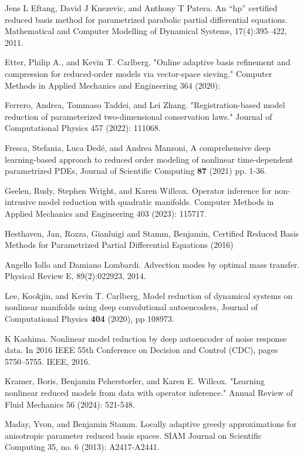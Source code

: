 \begin{thebibliography}{99.}
Jens L Eftang, David J Knezevic, and Anthony T Patera. An “hp” certified reduced
basis method for parametrized parabolic partial differential equations. Mathematical
and Computer Modelling of Dynamical Systems, 17(4):395–422, 2011.

Etter, Philip A., and Kevin T. Carlberg. "Online adaptive basis refinement and compression for reduced-order models via vector-space sieving." Computer Methods in Applied Mechanics and Engineering 364 (2020): 


Ferrero, Andrea, Tommaso Taddei, and Lei Zhang. "Registration-based model reduction of parameterized two-dimensional conservation laws." Journal of Computational Physics 457 (2022): 111068.


Fresca, Stefania, Luca Dedé, and Andrea Manzoni, A comprehensive deep learning-based approach to reduced order modeling of nonlinear time-dependent parametrized PDEs, Journal of Scientific Computing {\bf 87} (2021) pp. 1-36.

Geelen, Rudy, Stephen Wright, and Karen Willcox. Operator inference for non-intrusive model reduction with quadratic manifolds. Computer Methods in Applied Mechanics and Engineering 403 (2023): 115717.



Hesthaven, Jan, Rozza, Gianluigi and Stamm, Benjamin, Certified Reduced Basis Methods for Parametrized Partial Differential Equations (2016)


Angello Iollo and Damiano Lombardi. Advection modes by optimal mass transfer. Physical Review E, 89(2):022923, 2014.



Lee, Kookjin, and Kevin T. Carlberg, Model reduction of dynamical systems on nonlinear manifolds using deep convolutional autoencoders,  Journal of Computational Physics {\bf 404} (2020), pp 108973.

K Kashima. Nonlinear model reduction by deep autoencoder of noise response data. In 2016 IEEE 55th Conference on Decision and Control (CDC), pages 5750–5755. IEEE, 2016.

Kramer, Boris, Benjamin Peherstorfer, and Karen E. Willcox. "Learning nonlinear reduced models from data with operator inference." Annual Review of Fluid Mechanics 56 (2024): 521-548.


Maday, Yvon, and Benjamin Stamm. Locally adaptive greedy approximations for anisotropic parameter reduced basis spaces. SIAM Journal on Scientific Computing 35, no. 6 (2013): A2417-A2441.



\end{thebibliography}
